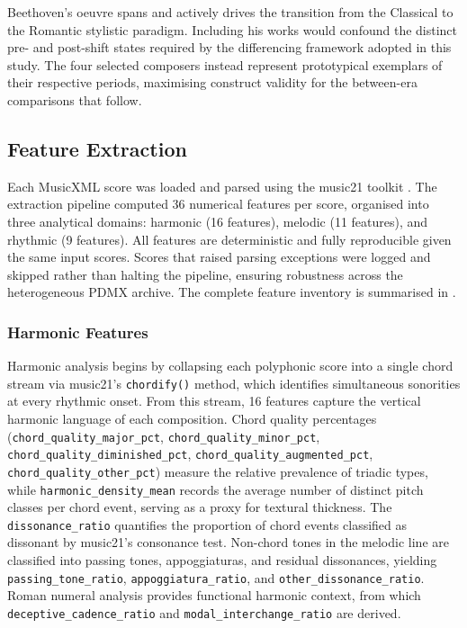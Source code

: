 \documentclass[]{interact}
\theoremstyle{plain}
\theoremstyle{definition}
\theoremstyle{remark}
\begin{document}
Beethoven's oeuvre spans and actively drives the transition from the Classical to
the Romantic stylistic paradigm. Including his works would confound the distinct
pre- and post-shift states required by the differencing framework adopted in this
study. The four selected composers instead represent prototypical exemplars of
their respective periods, maximising construct validity for the between-era
comparisons that follow.

\subsection{Feature Extraction}

Each MusicXML score was loaded and parsed using the music21 toolkit
\citep{Cuthbert2010}. The extraction pipeline computed 36 numerical features per
score, organised into three analytical domains: harmonic (16 features), melodic
(11 features), and rhythmic (9 features). All features are deterministic and
fully reproducible given the same input scores. Scores that raised parsing
exceptions were logged and skipped rather than halting the pipeline, ensuring
robustness across the heterogeneous PDMX archive. The complete feature inventory
is summarised in .

\subsubsection{Harmonic Features}

Harmonic analysis begins by collapsing each polyphonic score into a single chord
stream via music21's \texttt{chordify()} method, which identifies simultaneous
sonorities at every rhythmic onset. From this stream, 16 features capture the
vertical harmonic language of each composition. Chord quality percentages
(\texttt{chord\_quality\_major\_pct}, \texttt{chord\_quality\_minor\_pct},
\texttt{chord\_quality\_diminished\_pct}, \texttt{chord\_quality\_augmented\_pct},
\texttt{chord\_quality\_other\_pct}) measure the relative prevalence of triadic
types, while \texttt{harmonic\_density\_mean} records the average number of
distinct pitch classes per chord event, serving as a proxy for textural
thickness. The \texttt{dissonance\_ratio} quantifies the proportion of chord
events classified as dissonant by music21's consonance test. Non-chord tones in
the melodic line are classified into passing tones, appoggiaturas, and residual
dissonances, yielding \texttt{passing\_tone\_ratio},
\texttt{appoggiatura\_ratio}, and \texttt{other\_dissonance\_ratio}. Roman
numeral analysis provides functional harmonic context, from which
\texttt{deceptive\_cadence\_ratio} and \texttt{modal\_interchange\_ratio} are
derived.
\end{document}
